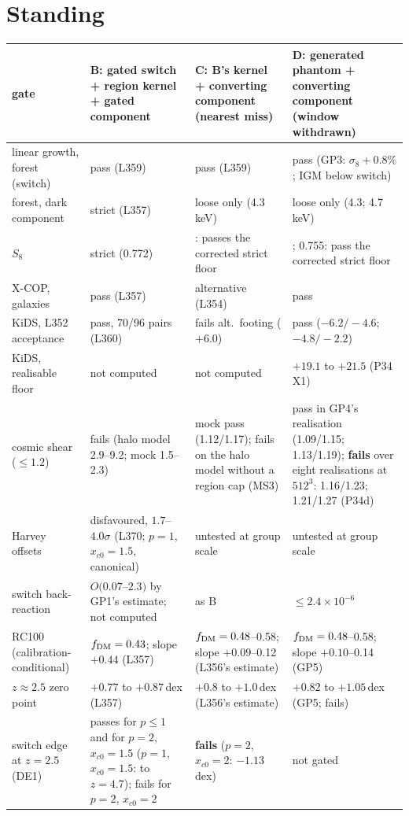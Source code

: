 \documentclass[10pt]{article}
\begin{document}
\section{Standing}\label{sec:standing}
\begin{center}
{\footnotesize
\begin{tabular}{@{}>{\raggedright\arraybackslash}p{}>{\raggedright\arraybackslash}p{}>{\raggedright\arraybackslash}p{}>{\raggedright\arraybackslash}p{}@{}}
\toprule
gate & B: gated switch + region kernel + gated component & C: B's kernel + converting component (nearest miss) & D: generated phantom + converting component (window withdrawn)\\
\midrule
linear growth, forest (switch) & pass (L359) & pass (L359) & pass (GP3: $\sigma_8+0.8\%$; IGM below switch)\\
forest, dark component & strict (L357) & loose only (4.3\,keV) & loose only (4.3; 4.7\,keV)\\
$S_8$ & strict (0.772) & 0.762: passes the corrected strict floor & 0.762; 0.755: pass the corrected strict floor\\
X-COP, galaxies & pass (L357) & alternative (L354) & pass\\
KiDS, L352 acceptance & pass, 70/96 pairs (L360) & fails alt.\ footing ($+6.0$) & pass ($-6.2/-4.6$; $-4.8/-2.2$)\\
KiDS, realisable floor & not computed & not computed & $+19.1$ to $+21.5$ (P34 X1)\\
cosmic shear ($\leq1.2$) & fails (halo model 2.9--9.2; mock 1.5--2.3) & mock pass (1.12/1.17); fails on the halo model without a region cap (MS3) & pass in GP4's realisation (1.09/1.15; 1.13/1.19); \textbf{fails} over eight realisations at $512^3$: 1.16/1.23; 1.21/1.27 (P34d)\\
Harvey offsets & disfavoured, $1.7$--$4.0\sigma$ (L370; $p=1$, $x_{c0}=1.5$, canonical) & untested at group scale & untested at group scale\\
switch back-reaction & $O(0.07$--$2.3)$ by GP1's estimate; not computed & as B & $\leq2.4\times10^{-6}$\\
RC100 (calibration-conditional) & $f_{\rm DM}=0.43$; slope $+0.44$ (L357) & $f_{\rm DM}=0.48$--0.58; slope $+0.09$--0.12 (L356's estimate) & $f_{\rm DM}=0.48$--0.58; slope $+0.10$--0.14 (GP5)\\
$z\approx2.5$ zero point & $+0.77$ to $+0.87$\,dex (L357) & $+0.8$ to $+1.0$\,dex (L356's estimate) & $+0.82$ to $+1.05$\,dex (GP5; fails)\\
switch edge at $z=2.5$ (DE1) & passes for $p\leq1$ and for $p=2$, $x_{c0}=1.5$ ($p=1$, $x_{c0}=1.5$: to $z=4.7$); fails for $p=2$, $x_{c0}=2$ & \textbf{fails} ($p=2$, $x_{c0}=2$: $-1.13$\,dex) & not gated\\
\bottomrule
\end{tabular}}
\end{center}
\end{document}
